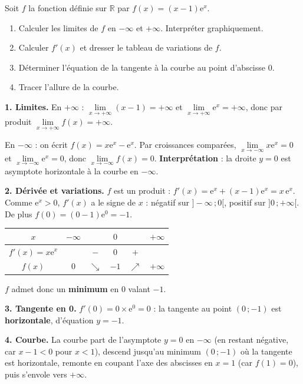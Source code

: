 \documentclass[11pt]{article}
\begin{document}
\begin{exoresolu}[Étude complète de $f(x) = (x-1)\mathrm{e}^x$]
Soit $f$ la fonction définie sur $\mathbb{R}$ par $f(x) = (x-1)\mathrm{e}^x$.
\begin{enumerate}
\item Calculer les limites de $f$ en $-\infty$ et $+\infty$. Interpréter graphiquement.
\item Calculer $f'(x)$ et dresser le tableau de variations de $f$.
\item Déterminer l'équation de la tangente à la courbe au point d'abscisse $0$.
\item Tracer l'allure de la courbe.
\end{enumerate}
\tcblower
\textbf{1. Limites.} En $+\infty$ : $\lim\limits_{x \to +\infty}(x-1) = +\infty$ et $\lim\limits_{x \to +\infty}\mathrm{e}^x = +\infty$, donc par produit $\lim\limits_{x \to +\infty} f(x) = +\infty$.

En $-\infty$ : on écrit $f(x) = x\mathrm{e}^x - \mathrm{e}^x$. Par croissances comparées, $\lim\limits_{x \to -\infty} x\mathrm{e}^x = 0$ et $\lim\limits_{x \to -\infty} \mathrm{e}^x = 0$, donc $\lim\limits_{x \to -\infty} f(x) = 0$. \textbf{Interprétation} : la droite $y = 0$ est asymptote horizontale à la courbe en $-\infty$.

\textbf{2. Dérivée et variations.} $f$ est un produit : $f'(x) = \mathrm{e}^x + (x-1)\mathrm{e}^x = x\,\mathrm{e}^x$. Comme $\mathrm{e}^x > 0$, $f'(x)$ a le signe de $x$ : négatif sur $]-\infty\,;0[$, positif sur $]0\,;+\infty[$. De plus $f(0) = (0-1)\mathrm{e}^0 = -1$.

\begin{center}
\begin{tabular}{|c|ccccc|}
\hline
\rowcolor{popblueL}
$x$ & $-\infty$ & & $0$ & & $+\infty$ \\
\hline
$f'(x) = x\mathrm{e}^x$ & & $-$ & $0$ & $+$ & \\
\hline
$f(x)$ & $0$ & $\searrow$ & $-1$ & $\nearrow$ & $+\infty$ \\
\hline
\end{tabular}
\end{center}

$f$ admet donc un \textbf{minimum} en $0$ valant $-1$.

\textbf{3. Tangente en 0.} $f'(0) = 0 \times \mathrm{e}^0 = 0$ : la tangente au point $(0\,;-1)$ est \textbf{horizontale}, d'équation $y = -1$.

\textbf{4. Courbe.} La courbe part de l'asymptote $y = 0$ en $-\infty$ (en restant négative, car $x - 1 < 0$ pour $x < 1$), descend jusqu'au minimum $(0\,;-1)$ où la tangente est horizontale, remonte en coupant l'axe des abscisses en $x = 1$ (car $f(1) = 0$), puis s'envole vers $+\infty$.
\end{exoresolu}
\end{document}
